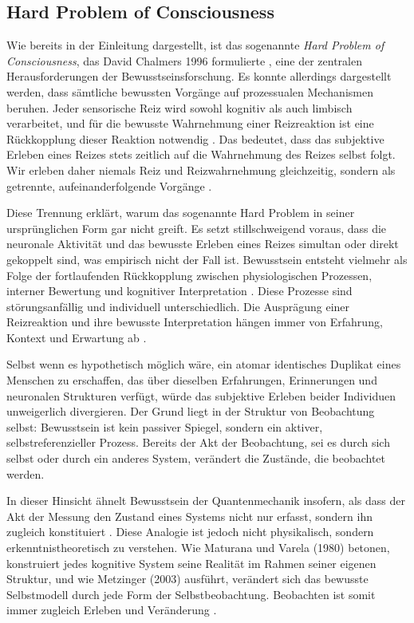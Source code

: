 \subsection*{Hard Problem of Consciousness}

Wie bereits in der Einleitung dargestellt, ist das sogenannte \emph{Hard Problem of Consciousness}, das David Chalmers 1996 formulierte \cite{Chalmers1996}, eine der zentralen Herausforderungen der Bewusstseinsforschung. Es konnte allerdings dargestellt werden, dass sämtliche bewussten Vorgänge auf prozessualen Mechanismen beruhen. Jeder sensorische Reiz wird sowohl kognitiv als auch limbisch verarbeitet, und für die bewusste Wahrnehmung einer Reizreaktion ist eine Rückkopplung dieser Reaktion notwendig \cite{Damasio1999, Craig2009}. Das bedeutet, dass das subjektive Erleben eines Reizes stets zeitlich auf die Wahrnehmung des Reizes selbst folgt. Wir erleben daher niemals Reiz und Reizwahrnehmung gleichzeitig, sondern als getrennte, aufeinanderfolgende Vorgänge \cite{Libet1993, LeDoux1996}.

Diese Trennung erklärt, warum das sogenannte Hard Problem in seiner ursprünglichen Form gar nicht greift. Es setzt stillschweigend voraus, dass die neuronale Aktivität und das bewusste Erleben eines Reizes simultan oder direkt gekoppelt sind, was empirisch nicht der Fall ist. Bewusstsein entsteht vielmehr als Folge der fortlaufenden Rückkopplung zwischen physiologischen Prozessen, interner Bewertung und kognitiver Interpretation \cite{Damasio1994, Craig2002}. Diese Prozesse sind störungsanfällig und individuell unterschiedlich. Die Ausprägung einer Reizreaktion und ihre bewusste Interpretation hängen immer von Erfahrung, Kontext und Erwartung ab \cite{Barrett2017}.

Selbst wenn es hypothetisch möglich wäre, ein atomar identisches Duplikat eines Menschen zu erschaffen, das über dieselben Erfahrungen, Erinnerungen und neuronalen Strukturen verfügt, würde das subjektive Erleben beider Individuen unweigerlich divergieren. Der Grund liegt in der Struktur von Beobachtung selbst: Bewusstsein ist kein passiver Spiegel, sondern ein aktiver, selbstreferenzieller Prozess. Bereits der Akt der Beobachtung, sei es durch sich selbst oder durch ein anderes System, verändert die Zustände, die beobachtet werden.

In dieser Hinsicht ähnelt Bewusstsein der Quantenmechanik insofern, als dass der Akt der Messung den Zustand eines Systems nicht nur erfasst, sondern ihn zugleich konstituiert \cite{Heisenberg1927}. Diese Analogie ist jedoch nicht physikalisch, sondern erkenntnistheoretisch zu verstehen. Wie Maturana und Varela (1980) betonen, konstruiert jedes kognitive System seine Realität im Rahmen seiner eigenen Struktur, und wie Metzinger (2003) ausführt, verändert sich das bewusste Selbstmodell durch jede Form der Selbstbeobachtung. Beobachten ist somit immer zugleich Erleben und Veränderung \cite{Maturana1980,Metzinger2003}.

